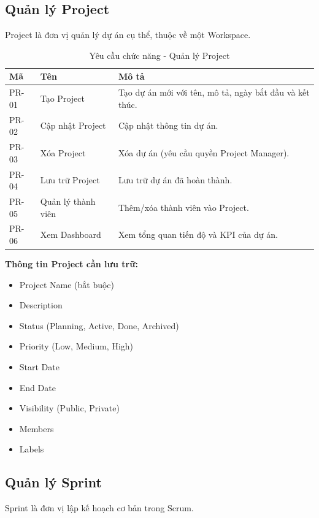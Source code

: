 \documentclass[12pt,a4paper]{report}
\begin{document}
\subsection{Quản lý Project}

Project là đơn vị quản lý dự án cụ thể, thuộc về một Workspace.

\begin{table}[H]
\centering
\caption{Yêu cầu chức năng - Quản lý Project}
\begin{tabular}{|p{2.5cm}|p{3.5cm}|p{8cm}|}
\hline
\textbf{Mã} & \textbf{Tên} & \textbf{Mô tả} \\
\hline
PR-01 & Tạo Project & Tạo dự án mới với tên, mô tả, ngày bắt đầu và kết thúc. \\
\hline
PR-02 & Cập nhật Project & Cập nhật thông tin dự án. \\
\hline
PR-03 & Xóa Project & Xóa dự án (yêu cầu quyền Project Manager). \\
\hline
PR-04 & Lưu trữ Project & Lưu trữ dự án đã hoàn thành. \\
\hline
PR-05 & Quản lý thành viên & Thêm/xóa thành viên vào Project. \\
\hline
PR-06 & Xem Dashboard & Xem tổng quan tiến độ và KPI của dự án. \\
\hline
\end{tabular}
\label{tab:project_management_requirements}
\end{table}

\textbf{Thông tin Project cần lưu trữ:}

\begin{itemize}
\item Project Name (bắt buộc)
\item Description
\item Status (Planning, Active, Done, Archived)
\item Priority (Low, Medium, High)
\item Start Date
\item End Date
\item Visibility (Public, Private)
\item Members
\item Labels
\end{itemize}

\subsection{Quản lý Sprint}

Sprint là đơn vị lập kế hoạch cơ bản trong Scrum.
\end{document}
